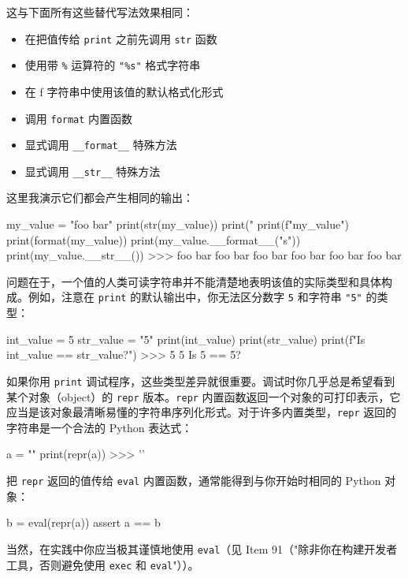 这与下面所有这些替代写法效果相同：

\begin{itemize}
\item 在把值传给 \texttt{print} 之前先调用 \texttt{str} 函数
\item 使用带 \texttt{\%} 运算符的 \texttt{"\%s"} 格式字符串
\item 在 f 字符串中使用该值的默认格式化形式
\item 调用 \texttt{format} 内置函数
\item 显式调用 \texttt{\_\_format\_\_} 特殊方法
\item 显式调用 \texttt{\_\_str\_\_} 特殊方法
\end{itemize}

这里我演示它们都会产生相同的输出：

\begin{codebox}[python]
my_value = "foo bar"
print(str(my_value))
print("%
print(f"{my_value}")
print(format(my_value))
print(my_value.__format__("s"))
print(my_value.__str__())
>>>
foo bar
foo bar
foo bar
foo bar
foo bar
foo bar
\end{codebox}

问题在于，一个值的人类可读字符串并不能清楚地表明该值的实际类型和具体构成。例如，注意在 \texttt{print} 的默认输出中，你无法区分数字 \texttt{5} 和字符串 \texttt{"5"} 的类型：

\begin{codebox}[python]
int_value = 5
str_value = "5"
print(int_value)
print(str_value)
print(f"Is {int_value} == {str_value}?")
>>>
5
5
Is 5 == 5?
\end{codebox}

如果你用 \texttt{print} 调试程序，这些类型差异就很重要。调试时你几乎总是希望看到某个对象（object）的 \texttt{repr} 版本。\texttt{repr} 内置函数返回一个对象的可打印表示，它应当是该对象最清晰易懂的字符串序列化形式。对于许多内置类型，\texttt{repr} 返回的字符串是一个合法的 Python 表达式：

\begin{codebox}[python]
a = ""
print(repr(a))
>>>
''
\end{codebox}

把 \texttt{repr} 返回的值传给 \texttt{eval} 内置函数，通常能得到与你开始时相同的 Python 对象：

\begin{codebox}[python]
b = eval(repr(a))
assert a == b
\end{codebox}

当然，在实践中你应当极其谨慎地使用 \texttt{eval}（见 Item 91（"除非你在构建开发者工具，否则避免使用 \texttt{exec} 和 \texttt{eval}"））。

